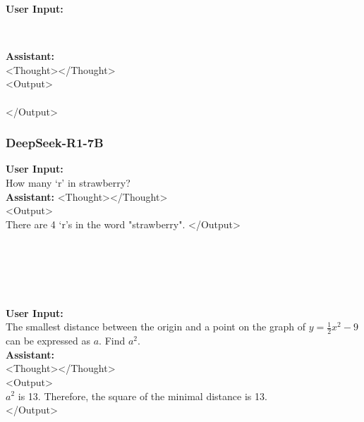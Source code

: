 \begin{abox} 
\textbf{User Input:}  \\

\ 

\textbf{Assistant:}\\
<Thought></Thought>\\
<Output>\\
\\
</Output>
\end{abox}

\subsubsection{DeepSeek-R1-7B}

\begin{abox} 
\textbf{User Input:}\\
How many `r' in strawberry? \\

\textbf{Assistant:}
<Thought></Thought>\\
<Output>\\
There are 4 `r's in the word "strawberry".
</Output>
\end{abox}

\ \\
\ \\
\ \\
\ \\

\begin{abox} 
\textbf{User Input:}  \\
The smallest distance between the origin and a point on the graph of $y=\frac{1}{2}x^2-9$ can be expressed as $a$.  Find $a^2$.  \\


\textbf{Assistant:}\\
<Thought></Thought>\\
<Output>\\
$a^2$ is 13. Therefore, the square of the minimal distance is 13.\\
</Output>
\end{abox}

